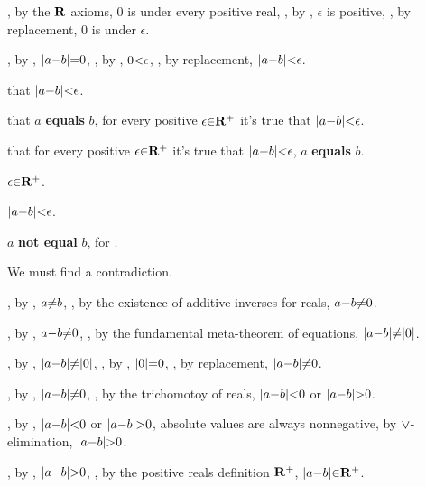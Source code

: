       \hs\hs\hs{}, by the ${\bf R}$ axioms, $0$ is under every positive real,
      ,  by , $\epsilon$ is positive,
      , by replacement,  $0$ is under $\epsilon$. \par

      \hs\hs\hs{}, by , $\a|a \p- b\a| \p=  0$,
      ,  by , $0 \p< \epsilon$,
      , by replacement, $\a|a \p- b\a| \p<  \epsilon$. \par

    \hs\hs {} that $\a|a \p- b\a| \p< \epsilon$. \par
  \hs{} that   $a$ {\bf equals} $b$,  for every positive $\epsilon\p\in \R^+$ it's true that $\a|a \p- b\a| \p< \epsilon$.

  \vs
  \hs {} that  for every positive $\epsilon\p\in \R^+$ it's true that $\a|a \p- b\a| \p< \epsilon$,  $a$ {\bf equals} $b$. \par
    \hs\hs{}  $\epsilon \p\in \R^+$. \par
    \hs\hs{}  $\a|a \p- b\a| \p< \epsilon$. \par
    \hs\hs{}  $a$ {\bf not equal} $b$, for . \par
    \hs\hs We must find a contradiction. \par
      \hs\hs\hs{}, by ,  $a \p{\not=} b$, , by the existence of additive inverses for reals,  $a \p- b \p{\not=} 0$. \par
      \hs\hs\hs{}, by ,  $a \p- b \p{\not=} 0$, , by the fundamental meta-theorem of equations,  $\a|a \p- b\a| \p{\not=} \a|0\a|$. \par
      \hs\hs\hs{}, by ,  $\a|a \p- b\a| \p{\not=} \a|0\a|$, , by , $\p|0\p|\p = 0$, , by replacement,  $\a|a \p- b\a| \p{\not=} 0$. \par
      \hs\hs\hs{}, by ,  $\a|a \p- b\a| \p{\not=} 0$, , by the trichomotoy of reals,  $\a|a \p- b\a| \p< 0$ or $\a|a \p- b\a| \p> 0$. \par
      \hs\hs\hs{}, by , $\a|a \p- b\a| \p< 0$ or $\a|a \p- b\a| \p> 0$,  absolute values are always nonnegative,  by $\p\lor$-elimination,  $\a|a \p- b\a| \p> 0$. \par
      \hs\hs\hs{}, by , $\a|a \p- b\a| \p> 0$, , by the positive reals definition ${\bf R}^+$,  $\a|a \p- b\a| \p\in \R^+$. \par
